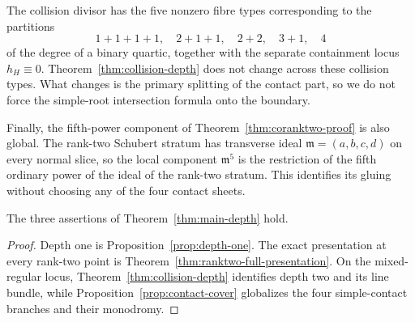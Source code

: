 The collision divisor has the five nonzero fibre types corresponding
to the partitions
\[
 1+1+1+1,\quad 2+1+1,\quad2+2,\quad3+1,\quad4
\]
of the degree of a binary quartic, together with the separate
containment locus $h_H\equiv0$.  Theorem~\ref{thm:collision-depth}
does not change across these collision types.  What changes is the
primary splitting of the contact part, so we do not force the
simple-root intersection formula onto the boundary.

Finally, the fifth-power component of
Theorem~\ref{thm:coranktwo-proof} is also global.  The rank-two
Schubert stratum has transverse ideal
$\mathfrak m=(a,b,c,d)$ on every normal slice, so the local component
$\mathfrak m^5$ is the restriction of the fifth ordinary power of
the ideal of the rank-two stratum.  This identifies its gluing without
choosing any of the four contact sheets.

\begin{corollary}
\label{cor:main-depth-proof}
The three assertions of Theorem~\ref{thm:main-depth} hold.
\end{corollary}
\begin{proof}
Depth one is Proposition~\ref{prop:depth-one}.  The exact presentation
at every rank-two point is
Theorem~\ref{thm:ranktwo-full-presentation}.  On the mixed-regular
locus, Theorem~\ref{thm:collision-depth} identifies depth two and its
line bundle, while Proposition~\ref{prop:contact-cover} globalizes the
four simple-contact branches and their monodromy.
\end{proof}
